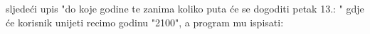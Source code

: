\documentclass{exam}
\begin{document}
\begin{itemize}
                                                                                sljedeći
                                                                                upis
                                                                                "do
                                                                                koje
                                                                                godine
                                                                                te
                                                                                zanima
                                                                                koliko
                                                                                puta
                                                                                će
                                                                                se
                                                                                dogoditi
                                                                                petak
                                                                                13.:
                                                                                "
                                                                                gdje
                                                                                će
                                                                                korisnik
                                                                                unijeti
                                                                                recimo
                                                                                godinu
                                                                                "2100",
                                                                                a
                                                                                program
                                                                                mu
                                                                                ispisati:
                                                                                        

\end{itemize}
\end{document}
